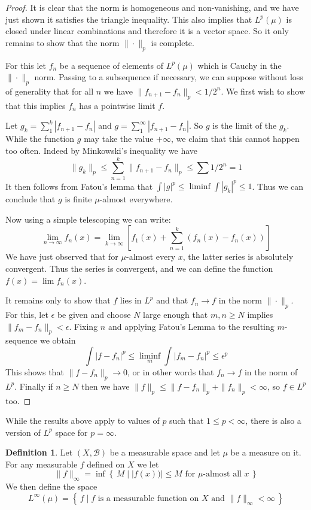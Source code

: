 \documentclass[11pt,oneside]{amsbook}
\newcommand{\set}[1]{\left\{\,#1\,\right\}}
\theoremstyle{definition}
\theoremstyle{plain}
\theoremstyle{definition}
\newtheorem{defn}[thm]{Definition}
\theoremstyle{remark}
\numberwithin{equation}{section}
\numberwithin{figure}{section}
\begin{document}
\begin{proof}
  It is clear that the norm is homogeneous and non-vanishing, and we have just shown it satisfies the triangle inequality. This also implies that $L^p(\mu)$ is closed under linear combinations and therefore it is a vector space. So it only remains to show that the norm $\|\cdot\|_p$ is complete.

  For this let $f_n$ be a sequence of elements of $L^p(\mu)$ which is Cauchy in the $\|\cdot\|_p$ norm. Passing to a subsequence if necessary, we can suppose without loss of generality that for all $n$ we have $\|f_{n+1}-f_n\|_p<1/2^n$. We first wish to show that this implies $f_n$ has a pointwise limit $f$.

  Let $g_k=\sum_1^k|f_{n+1}-f_n|$ and $g=\sum_1^\infty|f_{n+1}-f_n|$. So $g$ is the limit of the $g_k$. While the function $g$ may take the value $+\infty$, we claim that this cannot happen too often. Indeed by Minkowski's inequality we have
  \[\|g_k\|_p\leq\sum_{n=1}^k\|f_{n+1}-f_n\|_p\leq\sum1/2^n=1
  \]
  It then follows from Fatou's lemma that $\int|g|^p\leq\liminf\int|g_k|^p\leq1$. Thus we can conclude that $g$ is finite $\mu$-almost everywhere.

  Now using a simple telescoping we can write:
  \[\lim_{n\to\infty} f_n(x)=\lim_{k\to\infty}\left[f_1(x)
      +\sum_{n=1}^k(f_n(x)-f_n(x))\right]
  \]
  We have just observed that for $\mu$-almost every $x$, the latter series is absolutely convergent. Thus the series is convergent, and we can define the function $f(x)=\lim f_n(x)$.

  It remains only to show that $f$ lies in $L^p$ and that $f_n\to f$ in the norm $\|\cdot\|_p$. For this, let $\epsilon$ be given and choose $N$ large enough that $m,n\geq N$ implies $\|f_m-f_n\|_p<\epsilon$. Fixing $n$ and applying Fatou's Lemma to the resulting $m$-sequence we obtain
  \[\int|f-f_n|^p\leq\liminf_m\int|f_m-f_n|^p\leq\epsilon^p
  \]
  This shows that $\|f-f_n\|_p\to0$, or in other words that $f_n\to f$ in the norm of $L^p$. Finally if $n\geq N$ then we have $\|f\|_p\leq\|f-f_n\|_p+\|f_n\|_p<\infty$, so $f\in L^p$ too.
\end{proof}

While the results above apply to values of $p$ such that $1\leq p<\infty$, there is also a version of $L^p$ space for $p=\infty$.

\begin{defn}
  Let $(X,\mathcal B)$ be a measurable space and let $\mu$ be a measure on it. For any measurable $f$ defined on $X$ we let
  \[\|f\|_\infty=\inf\set{M\mid |f(x))|\leq M\text{ for $\mu$-almost all $x$}}
  \]
  We then define the space
  \[L^\infty(\mu)=\set{f\mid\text{$f$ is a measurable function on $X$ and } \|f\|_\infty<\infty}
  \]
\end{defn}
\end{document}
